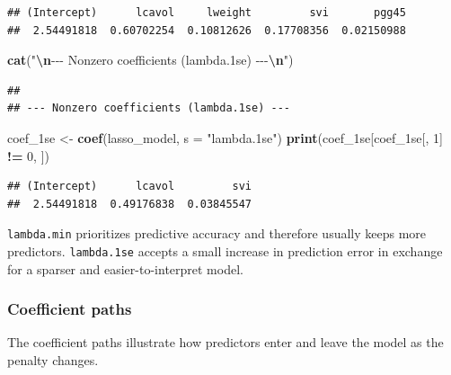 \documentclass[
  11pt,
]{article}
\newenvironment{Shaded}{\begin{snugshade}}{\end{snugshade}}
\newcommand{\AttributeTok}[1]{\textcolor[rgb]{0.13,0.29,0.53}{#1}}
\newcommand{\DecValTok}[1]{\textcolor[rgb]{0.00,0.00,0.81}{#1}}
\newcommand{\FunctionTok}[1]{\textcolor[rgb]{0.13,0.29,0.53}{\textbf{#1}}}
\newcommand{\NormalTok}[1]{#1}
\newcommand{\OtherTok}[1]{\textcolor[rgb]{0.56,0.35,0.01}{#1}}
\newcommand{\SpecialCharTok}[1]{\textcolor[rgb]{0.81,0.36,0.00}{\textbf{#1}}}
\newcommand{\StringTok}[1]{\textcolor[rgb]{0.31,0.60,0.02}{#1}}
\begin{document}
\begin{verbatim}
## (Intercept)      lcavol     lweight         svi       pgg45 
##  2.54491818  0.60702254  0.10812626  0.17708356  0.02150988
\end{verbatim}

\begin{Shaded}
\begin{Highlighting}[]
\FunctionTok{cat}\NormalTok{(}\StringTok{"}\SpecialCharTok{\textbackslash{}n}\StringTok{{-}{-}{-} Nonzero coefficients (lambda.1se) {-}{-}{-}}\SpecialCharTok{\textbackslash{}n}\StringTok{"}\NormalTok{)}
\end{Highlighting}
\end{Shaded}

\begin{verbatim}
## 
## --- Nonzero coefficients (lambda.1se) ---
\end{verbatim}

\begin{Shaded}
\begin{Highlighting}[]
\NormalTok{coef\_1se }\OtherTok{\textless{}{-}} \FunctionTok{coef}\NormalTok{(lasso\_model, }\AttributeTok{s =} \StringTok{"lambda.1se"}\NormalTok{)}
\FunctionTok{print}\NormalTok{(coef\_1se[coef\_1se[, }\DecValTok{1}\NormalTok{] }\SpecialCharTok{!=} \DecValTok{0}\NormalTok{, ])}
\end{Highlighting}
\end{Shaded}

\begin{verbatim}
## (Intercept)      lcavol         svi 
##  2.54491818  0.49176838  0.03845547
\end{verbatim}

\texttt{lambda.min} prioritizes predictive accuracy and therefore
usually keeps more predictors. \texttt{lambda.1se} accepts a small
increase in prediction error in exchange for a sparser and
easier-to-interpret model.

\subsubsection{Coefficient paths}\label{coefficient-paths-1}

The coefficient paths illustrate how predictors enter and leave the
model as the penalty changes.
\end{document}
